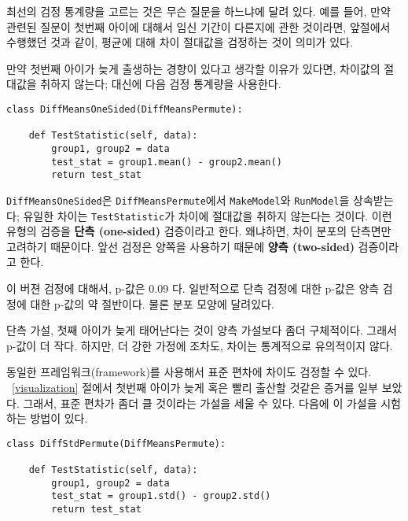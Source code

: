 최선의 검정 통계량을 고르는 것은 무슨 질문을 하느냐에 달려 있다.
예를 들어, 만약 관련된 질문이 첫번째 아이에 대해서 임신 기간이 다른지에 관한 것이라면, 앞절에서 수행했던 것과 같이, 평균에 대해 차이 절대값을 검정하는 것이 의미가 있다.


만약 첫번째 아이가 늦게 출생하는 경향이 있다고 생각할 이유가 있다면, 차이값의 절대값을 취하지 않는다; 대신에 다음 검정 통계량을 사용한다.

\begin{verbatim}
class DiffMeansOneSided(DiffMeansPermute):

    def TestStatistic(self, data):
        group1, group2 = data
        test_stat = group1.mean() - group2.mean()
        return test_stat
\end{verbatim}

{\tt DiffMeansOneSided}은 {\tt DiffMeansPermute}에서 {\tt MakeModel}와 {\tt RunModel}을 상속받는다; 유일한 차이는 {\tt TestStatistic}가 
차이에 절대값을 취하지 않는다는 것이다.
이런 유형의 검증을 {\bf 단측 (one-sided)} 검증이라고 한다. 왜냐하면,
차이 분포의 단측면만 고려하기 때문이다. 앞선 검정은 양쪽을 사용하기 때문에 {\bf 양측 (two-sided)} 검증이라고 한다.

이 버젼 검정에 대해서, p-값은 0.09 다. 일반적으로 단측 검정에 대한 p-값은 양측 검정에 대한 p-값의 약 절반이다. 물론 분포 모양에 달려있다.


단측 가설, 첫째 아이가 늦게 태어난다는 것이 양측 가설보다 좀더 구체적이다. 그래서 p-값이 더 작다. 하지만, 더 강한 가정에 조차도, 차이는 통계적으로 유의적이지 않다.


동일한 프레임워크(framework)를 사용해서 표준 편차에 차이도 검정할 수 있다. 
~\ref{visualization} 절에서 첫번째 아이가 늦게 혹은 빨리 출산할 것같은 증거를 일부 보았다. 그래서, 표준 편차가 좀더 클 것이라는 가설을 세울 수 있다. 다음에 이 가설을 시험하는 방법이 있다.


\begin{verbatim}
class DiffStdPermute(DiffMeansPermute):

    def TestStatistic(self, data):
        group1, group2 = data
        test_stat = group1.std() - group2.std()
        return test_stat
\end{verbatim}


